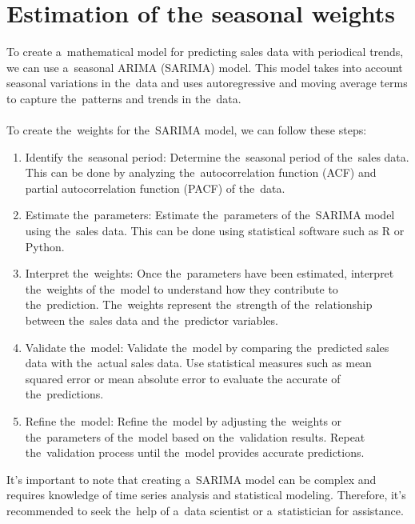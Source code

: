     \section{Estimation of the seasonal weights}\label{sec:weights}
    To create a~mathematical model for predicting sales data with periodical trends, we can use a~seasonal
    ARIMA (SARIMA) model. This model takes into account seasonal variations in the~data and uses autoregressive and
    moving average terms to capture the~patterns and trends in the~data.\\
    \\
    To create the~weights for the~SARIMA model, we can follow these steps:
    \begin{enumerate}
        \item Identify the~seasonal period: Determine the~seasonal period of the~sales data. This can be done by
        analyzing the~autocorrelation function (ACF) and partial autocorrelation function (PACF) of the~data.
        \item Estimate the~parameters: Estimate the~parameters of the~SARIMA model using the~sales data.
        This can be done using statistical software such as R or Python.
        \item Interpret the~weights: Once the~parameters have been estimated, interpret the~weights of the~model
        to understand how they contribute to the~prediction. The~weights represent the~strength of the~relationship
        between the~sales data and the~predictor variables.
        \item Validate the~model: Validate the~model by comparing the~predicted sales data with the~actual sales data.
        Use statistical measures such as mean squared error or mean absolute error to evaluate the
        accurate of the~predictions.
        \item Refine the~model: Refine the~model by adjusting the~weights or the~parameters of the~model based on
        the~validation results. Repeat the~validation process until the~model provides accurate predictions.
    \end{enumerate}
    It's important to note that creating a~SARIMA model can be complex and requires knowledge of time series
    analysis and statistical modeling. Therefore, it's recommended to seek the~help of a~data scientist
    or a~statistician for assistance.

